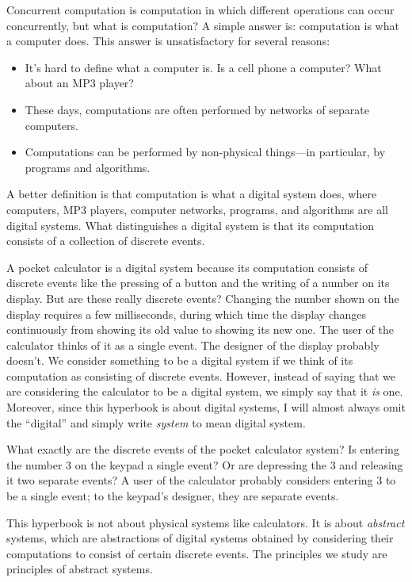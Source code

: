 \documentclass[fleqn,leqno]{article}
\begin{document}
Concurrent computation is computation in which different operations
can occur concurrently, but 
what is computation?  A simple answer is:
computation is what a computer does.  This answer is unsatisfactory
for several reasons:
\begin{itemize}
\item It's hard to define what a computer is.  Is a cell phone a
computer?  What about an MP3 player?

\item These days, computations are often performed by networks of
separate computers.

\item Computations can be performed by non-physical things---in particular,
by programs and algorithms.
\end{itemize}
A better definition is that computation is what a digital system does,
where computers, MP3 players, computer networks, programs, and
algorithms are all digital systems.  What distinguishes a digital
system is that its computation consists of a collection of discrete
events.  

A pocket calculator is a digital system because its computation
consists of discrete events like the pressing of a button and the
writing of a number on its display.  But are these really discrete
events?  Changing the number shown on the display requires a few
milliseconds, during which time the display changes continuously from
showing its old value to showing its new one.  The user of the
calculator thinks of it as a single event.  The designer of the
display probably doesn't.  We consider something to be a digital
system if we think of its computation as consisting of discrete
events.  However, instead of saying that we are considering the
calculator to be a digital system, we simply say that it \emph{is}
one.  Moreover, since this hyperbook is about digital systems, I will
almost always omit the ``digital'' and simply write 
\emph{system} to mean digital system.

What exactly are the discrete events of the pocket calculator system?
Is entering the number 3 on the keypad a single event?  Or are
depressing the 3 and releasing it two separate events?  A user of the
calculator probably considers entering 3 to be a single event; to the
keypad's designer, they are separate events.  

This hyperbook is not about physical systems like calculators.  It is
about 
\emph{abstract} systems, which are abstractions of digital systems
obtained by considering their computations to consist of certain
discrete events.  The principles we study are principles of abstract
systems.
\end{document}
